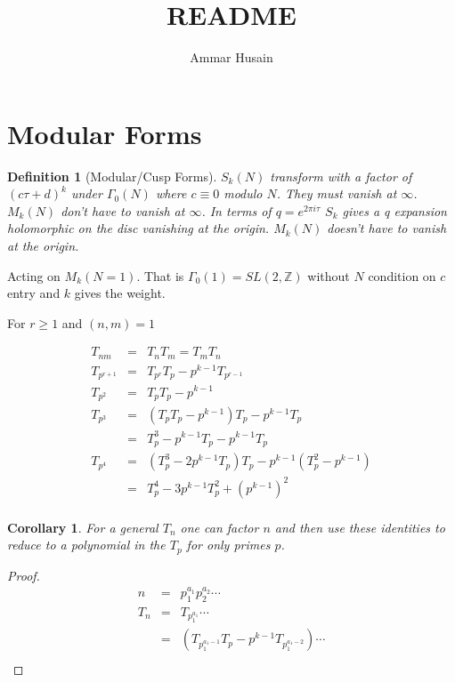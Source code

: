 \documentclass[11pt]{article}
\title{README}
\author{Ammar Husain}
\theoremstyle{change}
\newtheorem{definition}[equation]{Definition}
\newtheorem{cor}[equation]{Corollary}
\theoremstyle{nonumberplain}
\newtheorem{proof}{Proof}
\numberwithin{equation}{section}
\begin{document}
\maketitle

\section{Modular Forms}

\begin{definition}[Modular/Cusp Forms]
$S_k (N)$ transform with a factor of $(c \tau + d)^k$ under $\Gamma_0 (N)$ where $c \equiv 0$ modulo $N$. They must vanish at $\infty$. $M_k (N)$ don't have to vanish at $\infty$. In terms of $q = e^{2 \pi i \tau}$ $S_k$ gives a q expansion holomorphic on the disc vanishing at the origin. $M_k (N)$ doesn't have to vanish at the origin.
\end{definition}

Acting on $M_k (N=1)$. That is $\Gamma_0 (1) = SL(2,\mathbb{Z})$ without $N$ condition on $c$ entry and $k$ gives the weight.

For $r \geq 1$ and $(n,m)=1$

\begin{eqnarray*}
T_{nm} &=& T_n T_m = T_m T_n\\
T_{p^{r+1}} &=& T_{p^r} T_p - p^{k-1} T_{p^{r-1}}\\
T_{p^2} &=& T_{p} T_p - p^{k-1}\\
T_{p^3} &=& (T_{p} T_p - p^{k-1} ) T_p - p^{k-1} T_p\\
&=& T_p^3 - p^{k-1} T_p - p^{k-1} T_p\\
T_{p^4} &=& (T_p^3 - 2 p^{k-1} T_p) T_p - p^{k-1} (T_{p}^2 - p^{k-1})\\
&=& T_p^4 - 3 p^{k-1} T_p^2 + (p^{k-1})^2\\
\end{eqnarray*}

\begin{cor}
For a general $T_n$ one can factor $n$ and then use these identities to reduce to a polynomial in the $T_p$ for only primes $p$.
\end{cor}

\begin{proof}
\begin{eqnarray*}
n &=& p_1^{a_1} p_2^{a_2} \cdots\\
T_n &=& T_{p_1^{a_1}} \cdots\\
&=& (T_{p_1^{a_1-1}} T_p - p^{k-1} T_{p_1^{a_1-2}}) \cdots\\
\end{eqnarray*}
\end{proof}
\end{document}
